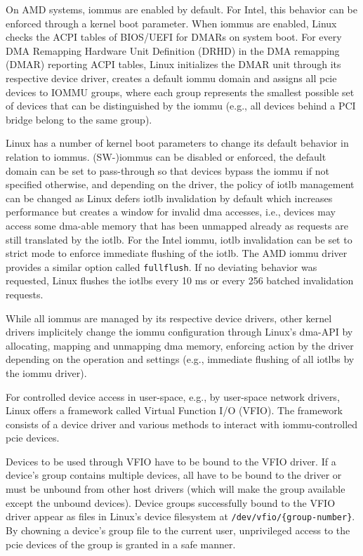 On AMD systems, \acp{iommu} are enabled by default. For Intel, this behavior can
be enforced through a kernel boot parameter. When \acp{iommu} are enabled, Linux
checks the ACPI tables of BIOS/UEFI for DMARs on system boot. For every DMA
Remapping Hardware Unit Definition (DRHD) in the DMA remapping (DMAR) reporting
ACPI tables, Linux initializes the DMAR unit through its respective device
driver, creates a default \ac{iommu} domain and assigns all \ac{pcie} devices to
IOMMU groups, where each group represents the smallest possible set of devices
that can be distinguished by the \ac{iommu} (e.g., all devices behind a PCI
bridge belong to the same group).

Linux has a number of kernel boot parameters to change its default behavior in
relation to \acp{iommu}. (SW-)\acp{iommu} can be disabled or enforced, the
default domain can be set to pass-through so that devices bypass the \ac{iommu}
if not specified otherwise, and depending on the driver, the policy of
\ac{iotlb} management can be changed as Linux defers \ac{iotlb} invalidation by
default which increases performance but creates a window for invalid \ac{dma}
accesses, i.e., devices may access some \ac{dma}-able memory that has been
unmapped already as requests are still translated by the \ac{iotlb}. For the
Intel \ac{iommu}, \ac{iotlb} invalidation can be set to strict mode to enforce
immediate flushing of the \ac{iotlb}. The AMD \ac{iommu} driver provides a
similar option called \texttt{fullflush}. If no deviating behavior was
requested, Linux flushes the \acp{iotlb} every 10 ms or every 256 batched
invalidation requests.

While all \acp{iommu} are managed by its respective device drivers, other kernel
drivers implicitely change the \ac{iommu} configuration through Linux's
\ac{dma}-API by allocating, mapping and unmapping \ac{dma} memory, enforcing
action by the driver depending on the operation and settings (e.g., immediate
flushing of all \acp{iotlb} by the \ac{iommu} driver).

For controlled device access in user-space, e.g., by user-space network drivers,
Linux offers a framework called Virtual Function I/O (VFIO). The framework
consists of a device driver and various methods to interact with
\ac{iommu}-controlled \ac{pcie} devices.

Devices to be used through VFIO have to be bound to the VFIO driver. If a
device's group contains multiple devices, all have to be bound to the driver or
must be unbound from other host drivers (which will make the group available
except the unbound devices). Device groups successfully bound to the VFIO driver
appear as files in Linux's device filesystem at \linebreak
\texttt{/dev/vfio/\{group-number\}}. By chowning a device's group file to the
current user, unprivileged access to the \ac{pcie} devices of the group is
granted in a safe manner.

